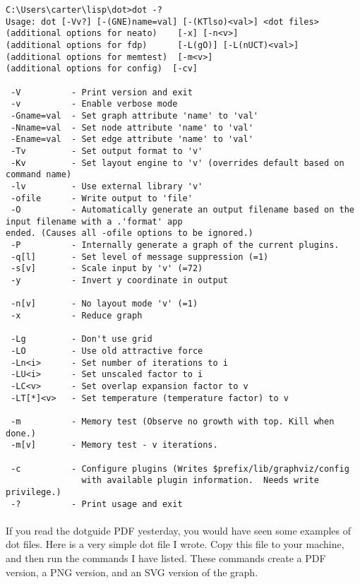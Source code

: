 \documentclass{article}
\begin{document}
\lstset{language=Lisp,numbers=left,keepspaces=false,basicstyle=\small,numberstyle=\tiny,breaklines=true,showstringspaces=false}
\begin{lstlisting}
C:\Users\carter\lisp\dot>dot -?
Usage: dot [-Vv?] [-(GNE)name=val] [-(KTlso)<val>] <dot files>
(additional options for neato)    [-x] [-n<v>]
(additional options for fdp)      [-L(gO)] [-L(nUCT)<val>]
(additional options for memtest)  [-m<v>]
(additional options for config)  [-cv]

 -V          - Print version and exit
 -v          - Enable verbose mode
 -Gname=val  - Set graph attribute 'name' to 'val'
 -Nname=val  - Set node attribute 'name' to 'val'
 -Ename=val  - Set edge attribute 'name' to 'val'
 -Tv         - Set output format to 'v'
 -Kv         - Set layout engine to 'v' (overrides default based on command name)
 -lv         - Use external library 'v'
 -ofile      - Write output to 'file'
 -O          - Automatically generate an output filename based on the input filename with a .'format' app
ended. (Causes all -ofile options to be ignored.)
 -P          - Internally generate a graph of the current plugins.
 -q[l]       - Set level of message suppression (=1)
 -s[v]       - Scale input by 'v' (=72)
 -y          - Invert y coordinate in output

 -n[v]       - No layout mode 'v' (=1)
 -x          - Reduce graph

 -Lg         - Don't use grid
 -LO         - Use old attractive force
 -Ln<i>      - Set number of iterations to i
 -LU<i>      - Set unscaled factor to i
 -LC<v>      - Set overlap expansion factor to v
 -LT[*]<v>   - Set temperature (temperature factor) to v

 -m          - Memory test (Observe no growth with top. Kill when done.)
 -m[v]       - Memory test - v iterations.

 -c          - Configure plugins (Writes $prefix/lib/graphviz/config
               with available plugin information.  Needs write privilege.)
 -?          - Print usage and exit
\end{lstlisting}


\paragraph{}If you read the dotguide PDF yesterday, you would have seen some examples of dot files. Here is a very simple dot file I wrote. Copy this file to your machine, and then run the commands I have listed. These commands create a PDF version, a PNG version, and an SVG version of the graph.
\end{document}
